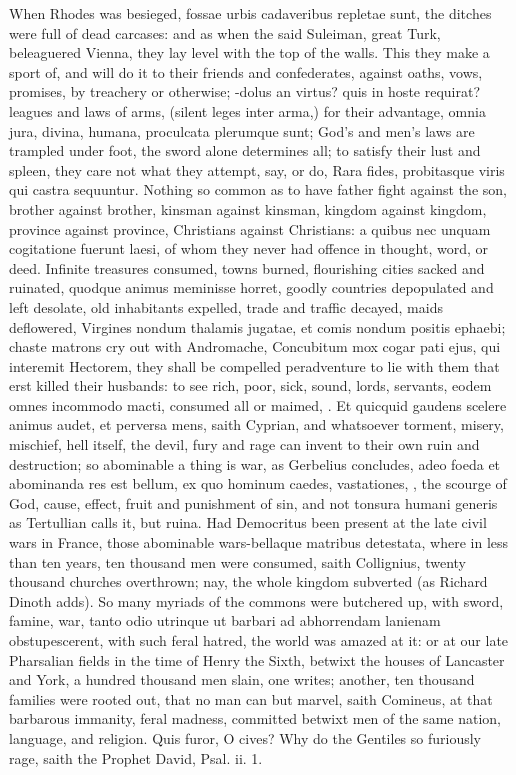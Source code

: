 {When Rhodes was besieged, fossae urbis cadaveribus repletae sunt,
the ditches were full of dead carcases: and as when the said Suleiman,
great Turk, beleaguered Vienna, they lay level with the top of the
walls. This they make a sport of, and will do it to their friends and
confederates, against oaths, vows, promises, by treachery or otherwise;
-dolus an virtus? quis in hoste requirat? leagues and laws of
arms, (silent leges inter arma,) for their advantage, omnia jura,
divina, humana, proculcata plerumque sunt; God's and men's laws are
trampled under foot, the sword alone determines all; to satisfy their
lust and spleen, they care not what they attempt, say, or do, Rara
fides, probitasque viris qui castra sequuntur. Nothing so common as to
have  father fight against the son, brother against brother,
kinsman against kinsman, kingdom against kingdom, province against
province, Christians against Christians: a quibus nec unquam
cogitatione fuerunt laesi, of whom they never had offence in thought,
word, or deed. Infinite treasures consumed, towns burned, flourishing
cities sacked and ruinated, quodque animus meminisse horret, goodly
countries depopulated and left desolate, old inhabitants expelled,
trade and traffic decayed, maids deflowered, Virgines nondum thalamis
jugatae, et comis nondum positis ephaebi; chaste matrons cry out with
Andromache, Concubitum mox cogar pati ejus, qui interemit
Hectorem, they shall be compelled peradventure to lie with them that
erst killed their husbands: to see rich, poor, sick, sound, lords,
servants, eodem omnes incommodo macti, consumed all or maimed, \etc{}. Et
quicquid gaudens scelere animus audet, et perversa mens, saith Cyprian,
and whatsoever torment, misery, mischief, hell itself, the devil, 
fury and rage can invent to their own ruin and destruction; so
abominable a thing is war, as Gerbelius concludes, adeo foeda et
abominanda res est bellum, ex quo hominum caedes, vastationes, \etc{}, the
scourge of God, cause, effect, fruit and punishment of sin, and not
tonsura humani generis as Tertullian calls it, but ruina. Had
Democritus been present at the late civil wars in France, those
abominable wars-bellaque matribus detestata, where in less than
ten years, ten thousand men were consumed, saith Collignius, twenty
thousand churches overthrown; nay, the whole kingdom subverted (as
Richard Dinoth adds). So many myriads of the commons were
butchered up, with sword, famine, war, tanto odio utrinque ut barbari
ad abhorrendam lanienam obstupescerent, with such feral hatred, the
world was amazed at it: or at our late Pharsalian fields in the time of
Henry the Sixth, betwixt the houses of Lancaster and York, a hundred
thousand men slain, one writes; another, ten thousand
families were rooted out, that no man can but marvel, saith Comineus,
at that barbarous immanity, feral madness, committed betwixt men of the
same nation, language, and religion. Quis furor, O cives? Why do
the Gentiles so furiously rage, saith the Prophet David, Psal. ii. 1.

}
